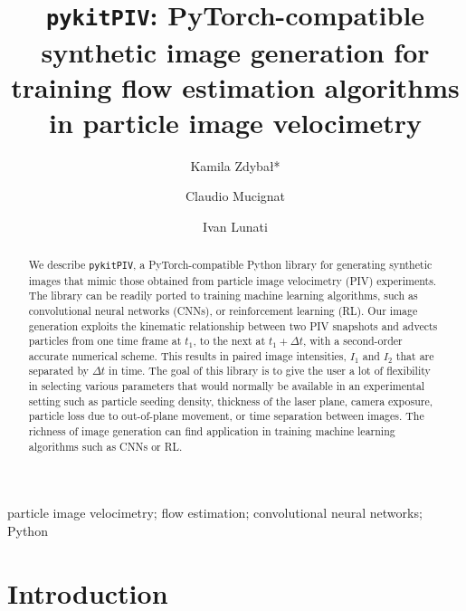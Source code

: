 \documentclass[a4paper,fleqn]{cas-dc}
\begin{document}


\title [mode = title]{\texttt{pykitPIV}: PyTorch-compatible synthetic image generation for training flow estimation algorithms in particle image velocimetry}

\author[EMPA]{Kamila Zdyba\l{}*}

\author[EMPA]{Claudio Mucignat}
\author[EMPA]{Ivan Lunati}

\address[EMPA]{Laboratory for Computational Engineering, Swiss Federal Laboratories for Materials Science and Technology, Empa, Dübendorf, Switzerland}

\begin{abstract} 
We describe \texttt{pykitPIV}, a PyTorch-compatible Python library for generating synthetic images that mimic those obtained from particle image velocimetry (PIV) experiments. The library can be readily ported to training machine learning algorithms, such as convolutional neural networks (CNNs), or reinforcement learning (RL). Our image generation exploits the kinematic relationship between two PIV snapshots and advects particles from one time frame at $t_1$, to the next at $t_1 + \Delta t$, with a second-order accurate numerical scheme. This results in paired image intensities, $I_1$ and $I_2$ that are separated by $\Delta t$ in time. The goal of this library is to give the user a lot of flexibility in selecting various parameters that would normally be available in an experimental setting such as particle seeding density, thickness of the laser plane, camera exposure, particle loss due to out-of-plane movement, or time separation between images. The richness of image generation can find application in training machine learning algorithms such as CNNs or RL.
\end{abstract}

\begin{keywords}
particle image velocimetry; flow estimation; convolutional neural networks; Python
\end{keywords}

\maketitle

\section{Introduction\label{sec:introduction}}
\end{document}
